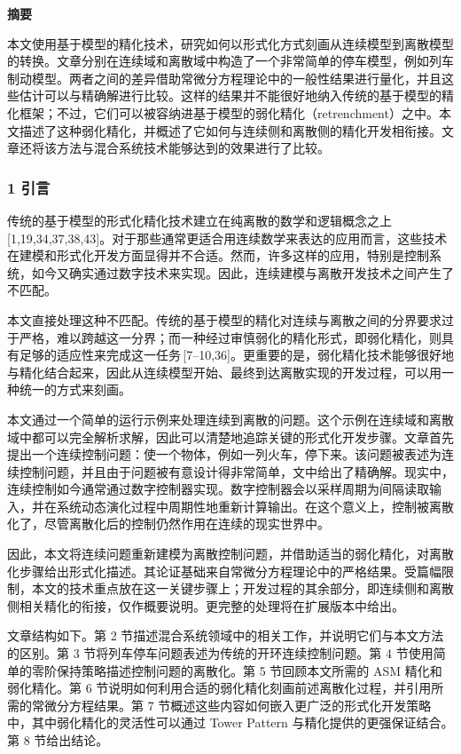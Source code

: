 {\songti{}\setlength{\parindent}{2em}

\noindent\textbf{摘要}

\indent 本文使用基于模型的精化技术，研究如何以形式化方式刻画从连续模型到离散模型的转换。文章分别在连续域和离散域中构造了一个非常简单的停车模型，例如列车制动模型。两者之间的差异借助常微分方程理论中的一般性结果进行量化，并且这些估计可以与精确解进行比较。这样的结果并不能很好地纳入传统的基于模型的精化框架；不过，它们可以被容纳进基于模型的弱化精化（retrenchment）之中。本文描述了这种弱化精化，并概述了它如何与连续侧和离散侧的精化开发相衔接。文章还将该方法与混合系统技术能够达到的效果进行了比较。

\subsubsection*{1 引言}

\indent 传统的基于模型的形式化精化技术建立在纯离散的数学和逻辑概念之上\,[1,19,34,37,38,43]。对于那些通常更适合用连续数学来表达的应用而言，这些技术在建模和形式化开发方面显得并不合适。然而，许多这样的应用，特别是控制系统，如今又确实通过数字技术来实现。因此，连续建模与离散开发技术之间产生了不匹配。

\indent 本文直接处理这种不匹配。传统的基于模型的精化对连续与离散之间的分界要求过于严格，难以跨越这一分界；而一种经过审慎弱化的精化形式，即弱化精化，则具有足够的适应性来完成这一任务\,[7--10,36]。更重要的是，弱化精化技术能够很好地与精化结合起来，因此从连续模型开始、最终到达离散实现的开发过程，可以用一种统一的方式来刻画。

\indent 本文通过一个简单的运行示例来处理连续到离散的问题。这个示例在连续域和离散域中都可以完全解析求解，因此可以清楚地追踪关键的形式化开发步骤。文章首先提出一个连续控制问题：使一个物体，例如一列火车，停下来。该问题被表述为连续控制问题，并且由于问题被有意设计得非常简单，文中给出了精确解。现实中，连续控制如今通常通过数字控制器实现。数字控制器会以采样周期为间隔读取输入，并在系统动态演化过程中周期性地重新计算输出。在这个意义上，控制被离散化了，尽管离散化后的控制仍然作用在连续的现实世界中。

\indent 因此，本文将连续问题重新建模为离散控制问题，并借助适当的弱化精化，对离散化步骤给出形式化描述。其论证基础来自常微分方程理论中的严格结果。受篇幅限制，本文的技术重点放在这一关键步骤上；开发过程的其余部分，即连续侧和离散侧相关精化的衔接，仅作概要说明。更完整的处理将在扩展版本中给出。

\indent 文章结构如下。第 2 节描述混合系统领域中的相关工作，并说明它们与本文方法的区别。第 3 节将列车停车问题表述为传统的开环连续控制问题。第 4 节使用简单的零阶保持策略描述控制问题的离散化。第 5 节回顾本文所需的 ASM 精化和弱化精化。第 6 节说明如何利用合适的弱化精化刻画前述离散化过程，并引用所需的常微分方程结果。第 7 节概述这些内容如何嵌入更广泛的形式化开发策略中，其中弱化精化的灵活性可以通过 Tower Pattern 与精化提供的更强保证结合。第 8 节给出结论。

}
